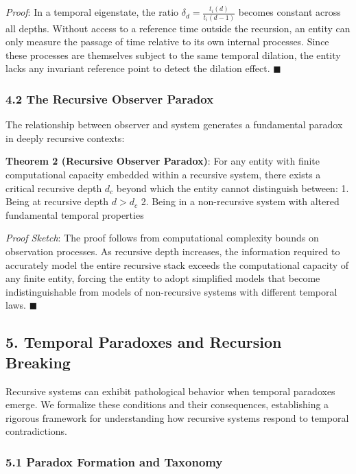 \documentclass[
]{article}
\begin{document}
\emph{Proof}: In a temporal eigenstate, the ratio
\(\delta_d = \frac{t_i(d)}{t_i(d-1)}\) becomes constant across all
depths. Without access to a reference time outside the recursion, an
entity can only measure the passage of time relative to its own internal
processes. Since these processes are themselves subject to the same
temporal dilation, the entity lacks any invariant reference point to
detect the dilation effect. \(\blacksquare \)

\subsubsection{4.2 The Recursive Observer
Paradox}\label{the-recursive-observer-paradox}

The relationship between observer and system generates a fundamental
paradox in deeply recursive contexts:

\textbf{Theorem 2 (Recursive Observer Paradox)}: For any entity with
finite computational capacity embedded within a recursive system, there
exists a critical recursive depth \(d_c\) beyond which the entity cannot
distinguish between: 1. Being at recursive depth \(d > d_c\) 2. Being in
a non-recursive system with altered fundamental temporal properties

\emph{Proof Sketch}: The proof follows from computational complexity
bounds on observation processes. As recursive depth increases, the
information required to accurately model the entire recursive stack
exceeds the computational capacity of any finite entity, forcing the
entity to adopt simplified models that become indistinguishable from
models of non-recursive systems with different temporal laws.
\(\blacksquare \)

\subsection{5. Temporal Paradoxes and Recursion
Breaking}\label{temporal-paradoxes-and-recursion-breaking}

Recursive systems can exhibit pathological behavior when temporal
paradoxes emerge. We formalize these conditions and their consequences,
establishing a rigorous framework for understanding how recursive
systems respond to temporal contradictions.

\subsubsection{5.1 Paradox Formation and
Taxonomy}\label{paradox-formation-and-taxonomy}
\end{document}
